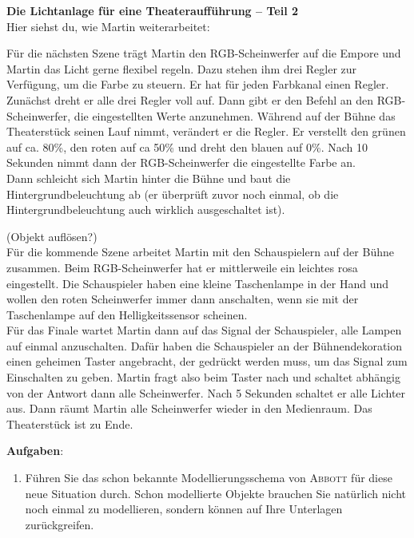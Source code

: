 \documentclass[11pt, a4paper]{article}
\begin{document}
\pagestyle{empty}
\textbf{{\Large Die Lichtanlage für eine Theateraufführung -- Teil 2}}\\

Hier siehst du, wie Martin weiterarbeitet:

\begin{mdframed}
Für die nächsten Szene trägt Martin den RGB-Scheinwerfer auf die Empore und Martin das Licht gerne flexibel regeln. Dazu stehen ihm drei Regler zur Verfügung, um die Farbe zu steuern. Er hat für jeden Farbkanal einen Regler.\\

Zunächst dreht er alle drei Regler voll auf. Dann gibt er den Befehl an den RGB-Scheinwerfer, die eingestellten Werte anzunehmen. Während auf der Bühne das Theaterstück seinen Lauf nimmt, verändert er die Regler. Er verstellt den grünen auf ca. 80\%, den roten auf ca 50\% und dreht den blauen auf 0\%. Nach 10 Sekunden nimmt dann der RGB-Scheinwerfer die eingestellte Farbe an.\\

Dann schleicht sich Martin hinter die Bühne und baut die Hintergrundbeleuchtung ab (er überprüft zuvor noch einmal, ob die Hintergrundbeleuchtung auch wirklich ausgeschaltet ist).

(Objekt auflösen?)\\

Für die kommende Szene arbeitet Martin mit den Schauspielern auf der Bühne zusammen. Beim RGB-Scheinwerfer hat er mittlerweile ein leichtes rosa eingestellt. Die Schauspieler haben eine kleine Taschenlampe in der Hand und wollen den roten Scheinwerfer immer dann anschalten, wenn sie mit der Taschenlampe auf den Helligkeitssensor scheinen.\\

Für das Finale wartet Martin dann auf das Signal der Schauspieler, alle Lampen auf einmal anzuschalten. Dafür haben die Schauspieler an der Bühnendekoration einen geheimen Taster angebracht, der gedrückt werden muss, um das Signal zum Einschalten zu geben. Martin fragt also beim Taster nach und schaltet abhängig von der Antwort dann alle Scheinwerfer. Nach 5 Sekunden schaltet er alle Lichter aus. Dann räumt Martin alle Scheinwerfer wieder in den Medienraum. Das Theaterstück ist zu Ende. 
\end{mdframed}

\vfill
\textbf{Aufgaben}:
\begin{enumerate}
\item Führen Sie das schon bekannte Modellierungsschema von \textsc{Abbott} für diese neue Situation durch. Schon modellierte Objekte brauchen Sie natürlich nicht noch einmal zu modellieren, sondern können auf Ihre Unterlagen zurückgreifen.
\end{enumerate}
\end{document}
